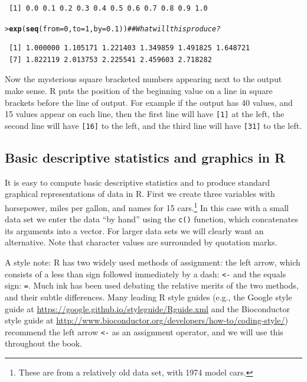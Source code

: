 \documentclass[12pt,oneside]{book}\usepackage[]{graphicx}\usepackage[]{color}
\makeatletter
\newcommand{\hlnum}[1]{\textcolor[rgb]{0.686,0.059,0.569}{#1}}%
\newcommand{\hlcom}[1]{\textcolor[rgb]{0.678,0.584,0.686}{\textit{#1}}}%
\newcommand{\hlstd}[1]{\textcolor[rgb]{0.345,0.345,0.345}{#1}}%
\newcommand{\hlkwc}[1]{\textcolor[rgb]{0.333,0.667,0.333}{#1}}%
\newcommand{\hlkwd}[1]{\textcolor[rgb]{0.737,0.353,0.396}{\textbf{#1}}}%
\newenvironment{kframe}{%
 \def\at@end@of@kframe{}%
 \ifinner\ifhmode%
  \def\at@end@of@kframe{\end{minipage}}%
  \begin{minipage}{\columnwidth}%
 \fi\fi%
 \def\FrameCommand##1{\hskip\@totalleftmargin \hskip-\fboxsep
 \colorbox{shadecolor}{##1}\hskip-\fboxsep
     \hskip-\linewidth \hskip-\@totalleftmargin \hskip\columnwidth}%
 \MakeFramed {\advance\hsize-\width
   \@totalleftmargin\z@ \linewidth\hsize
   \@setminipage}}%
 {\par\unskip\endMakeFramed%
 \at@end@of@kframe}
\newenvironment{knitrout}{}{} %
\makeatother
\begin{document}
\begin{knitrout}
\begin{kframe}
\begin{verbatim}
 [1] 0.0 0.1 0.2 0.3 0.4 0.5 0.6 0.7 0.8 0.9 1.0
\end{verbatim}
\begin{alltt}
\hlstd{> }\hlkwd{exp}\hlstd{(}\hlkwd{seq}\hlstd{(}\hlkwc{from} \hlstd{=} \hlnum{0}\hlstd{,} \hlkwc{to} \hlstd{=} \hlnum{1}\hlstd{,} \hlkwc{by} \hlstd{=} \hlnum{0.1}\hlstd{))}  \hlcom{##What will this produce?}
\end{alltt}
\begin{verbatim}
 [1] 1.000000 1.105171 1.221403 1.349859 1.491825 1.648721
 [7] 1.822119 2.013753 2.225541 2.459603 2.718282
\end{verbatim}
\end{kframe}
\end{knitrout}

Now the mysterious square bracketed numbers appearing next to the output make sense. R puts the position of the beginning value on a line in square brackets before the line of output. For example if the output has 40 values, and 15 values appear on each line, then the first line will have \verb+[1]+ at the left, the second line will have \verb+[16]+ to the left, and the third line will have \verb+[31]+ to the left.

\subsection{Basic descriptive statistics and graphics in R}\label{sec:dec}
It is easy to compute basic descriptive statistics and to produce standard graphical representations of data in R. First we create three variables with horsepower, miles per gallon, and names for 15 cars.\footnote{These are from a relatively old data set, with 1974 model cars.} In this case with a small data set we enter the data ``by hand'' using the \verb+c()+ function, which concatenates its arguments into a vector. For larger data sets we will clearly want an alternative. Note that character values are surrounded by quotation marks.

A style note: R has two widely used methods of assignment: the left arrow, which consists of a less than sign followed immediately by a dash: \verb+<-+ and the equals sign: \verb+=+. Much ink has been used debating the relative merits of the two methods, and their subtle differences. Many leading R style guides (e.g., the Google style guide at \url{https://google.github.io/styleguide/Rguide.xml} and the Bioconductor style guide at \url{http://www.bioconductor.org/developers/how-to/coding-style/}) recommend the left arrow \verb+<-+ as an assignment operator, and we will use this throughout the book. 
\end{document}
